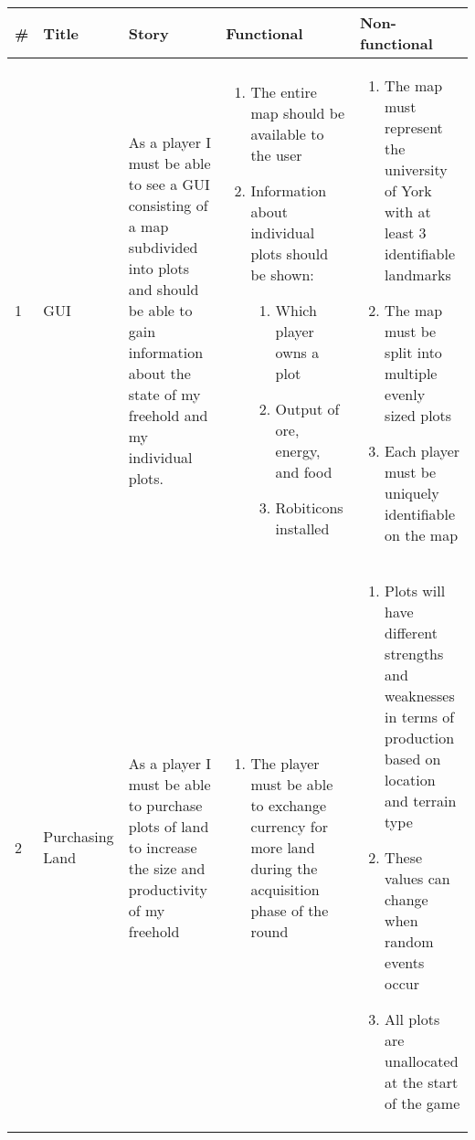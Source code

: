 \documentclass{article}
\begin{document}
	\begin{landscape}
	\begin{longtable}{|l||l|p{4cm}|p{8cm}|p{7cm}|}
		\hline
		\# & Title & Story & Functional & Non-functional \\ \hline \hline \endhead
		1 & GUI & As a player I must be able to see a GUI consisting of a map subdivided into plots and should be able to gain information about the state of my freehold and my individual plots.
		& \begin{enumerate}[label=1.1.\arabic*.]
			\item The entire map should be available to the user
			\item Information about individual plots should be shown:
			\begin{enumerate}
				\item Which player owns a plot
				\item Output of ore, energy, and food
				\item Robiticons installed
			\end{enumerate}
		\end{enumerate}
		& \begin{enumerate}[label=1.2.\arabic*.]
			\item The map must represent the university of York with at least 3 identifiable landmarks
			\item The map must be split into multiple evenly sized plots
			\item Each player must be uniquely identifiable on the map
		\end{enumerate} \\ \hline
	
	2 & Purchasing Land
	& As a player I must be able to purchase plots of land to increase the size and productivity of my freehold
	& \begin{enumerate}[label=2.1.\arabic*.]
		\item The player must be able to exchange currency for more land during the acquisition phase of the round
	\end{enumerate}
	& \begin{enumerate}[label=2.2.\arabic*.]
		\item Plots will have different strengths and weaknesses in terms of production based on location and terrain type
		\item These values can change when random events occur
		\item All plots are unallocated at the start of the game
	\end{enumerate} \\ \hline


\end{longtable}
\end{landscape}
\end{document}
